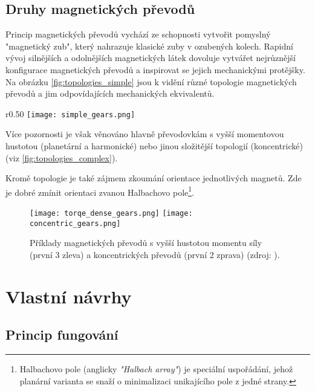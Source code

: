 \subsection{Druhy magnetických převodů}
Princip magnetických převodů vychází ze schopnosti vytvořit pomyslný "magnetický zub", který nahrazuje klasické zuby v ozubených kolech. Rapidní vývoj silnějších a odolnějších magnetických látek dovoluje vytvářet nejrůznější konfigurace magnetických převodů a inspirovat se jejich mechanickými protějšky. Na obrázku \ref{fig:topologies_simple} jsou k vidění různé topologie magnetických převodů a jim odpovídajících mechanických ekvivalentů.
\begin{wrapfigure}{r}{0.50\textwidth}
    \vspace{-4cm}
    \texttt{[image: simple\_gears.png]}
    \centering
    \caption{Základní magnetické topologie a jejich mechanické ekvivalenty (zdroj: \cite{MG_topologies}).}
    \label{fig:topologies_simple}
\end{wrapfigure}

Více pozornosti je však věnováno hlavně převodovkám s vyšší momentovou hustotou (planetární a harmonické) nebo jinou složitější topologií (koncentrické) (viz \autoref{fig:topologies_complex}).

Kromě topologie je také zájmem zkoumání orientace jednotlivých magnetů. Zde je dobré zmínit orientaci zvanou Halbachovo pole\footnote{Halbachovo pole (anglicky \textit{"Halbach array"}) je speciální uspořádání, jehož planární varianta se snaží o minimalizaci unikajícího pole z jedné strany.}.
\begin{figure}[H]
    \texttt{[image: torqe\_dense\_gears.png]}
    \texttt{[image: concentric\_gears.png]}
    \centering
    \caption[Příklady magnetických převodů s vyšší hustotou momentu síly a koncentrických převodů]{Příklady magnetických převodů s vyšší hustotou momentu síly (první 3 zleva) a koncentrických převodů (první 2 zprava) (zdroj: \cite{MG_topologies}).}
    \label{fig:topologies_complex}
\end{figure}

\section{Vlastní návrhy}

\subsection{Princip fungování}

